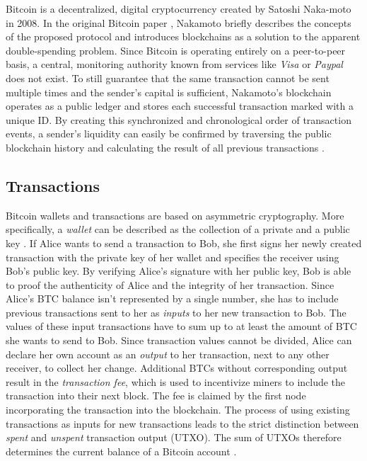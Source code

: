 \documentclass[a4paper,12pt,twoside]{report}
\begin{document}
 Bitcoin is a decentralized, digital cryptocurrency created by Satoshi Naka-moto in 2008. In the original Bitcoin paper \cite{nakamoto2008bitcoin}, Nakamoto briefly describes the concepts of the proposed protocol and introduces blockchains as a solution to the apparent double-spending problem. Since Bitcoin is operating entirely on a peer-to-peer basis, a central, monitoring authority known from services like \textit{Visa} or \textit{Paypal} does not exist. To still guarantee that the same transaction cannot be sent multiple times and the sender's capital is sufficient, Nakamoto's blockchain operates as a public ledger and stores each successful transaction marked with a unique ID. By creating this synchronized and chronological order of transaction events, a sender's liquidity can easily be confirmed by traversing the public blockchain history and calculating the result of all previous transactions \cite{nakamoto2008bitcoin,bitcoinwiki}.

\subsection{Transactions}
Bitcoin wallets and transactions are based on asymmetric cryptography. More specifically, a \textit{wallet} can be described as the collection of a private and a public key \cite{okupski2014bitcoin}. If Alice wants to send a transaction to Bob, she first signs her newly created transaction with the private key of her wallet and specifies the receiver using Bob's public key. By verifying Alice's signature with her public key, Bob is able to proof the authenticity of Alice and the integrity of her transaction. Since Alice's BTC balance isn't represented by a single number, she has to include previous transactions sent to her as \textit{inputs} to her new transaction to Bob. The values of these input transactions have to sum up to at least the amount of BTC she wants to send to Bob. Since transaction values cannot be divided, Alice can declare her own account as an \textit{output} to her transaction, next to any other receiver, to collect her change. Additional BTCs without corresponding output result in the \textit{transaction fee}, which is used to incentivize miners to include the transaction into their next block. The fee is claimed by the first node incorporating the transaction into the blockchain. The process of using existing transactions as inputs for new transactions leads to the strict distinction between \textit{spent} and \textit{unspent} transaction output (UTXO). The sum of UTXOs therefore determines the current balance of a Bitcoin account \cite{antonopoulos2017mastering}.
\end{document}

